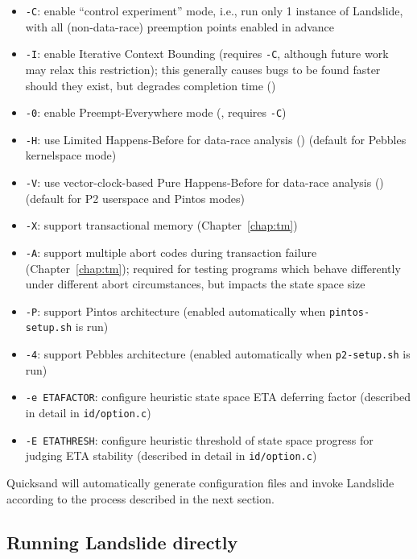 \begin{itemize}
	\item {\tt -C}: enable ``control experiment'' mode, i.e., run only 1 instance of Landslide, with all (non-data-race) preemption points enabled in advance
	\item {\tt -I}: enable Iterative Context Bounding (requires {\tt -C}, although future work may relax this restriction);
		this generally causes bugs to be found faster should they exist, but degrades completion time
		(\sect{\ref{sec:landslide-icb}})
	\item {\tt -0}: enable Preempt-Everywhere mode (\sect{\ref{sec:quicksand-eval}}, requires {\tt -C})
	\item {\tt -H}: use Limited Happens-Before for data-race analysis (\sect{\ref{sec:background-hb}})
		(default for Pebbles kernelspace mode)
	\item {\tt -V}: use vector-clock-based Pure Happens-Before for data-race analysis (\sect{\ref{sec:background-hb}})
		(default for P2 userspace and Pintos modes)
	\item {\tt -X}: support transactional memory (Chapter~\ref{chap:tm})
	\item {\tt -A}: support multiple abort codes during transaction failure (Chapter~\ref{chap:tm});
		required for testing programs which behave differently under different abort circumstances,
		but impacts the state space size
	\item {\tt -P}: support Pintos architecture (enabled automatically when {\tt pintos-setup.sh} is run)
	\item {\tt -4}: support Pebbles architecture (enabled automatically when {\tt p2-setup.sh} is run)
	\item {\tt -e ETAFACTOR}: configure heuristic state space ETA deferring factor (described in detail in {\tt id/option.c})
	\item {\tt -E ETATHRESH}: configure heuristic threshold of state space progress for judging ETA stability (described in detail in {\tt id/option.c})
\end{itemize}

Quicksand will automatically generate configuration files and invoke Landslide according to the process described in the next section.

\subsection{Running Landslide directly}
\label{sec:landslide-directly}

